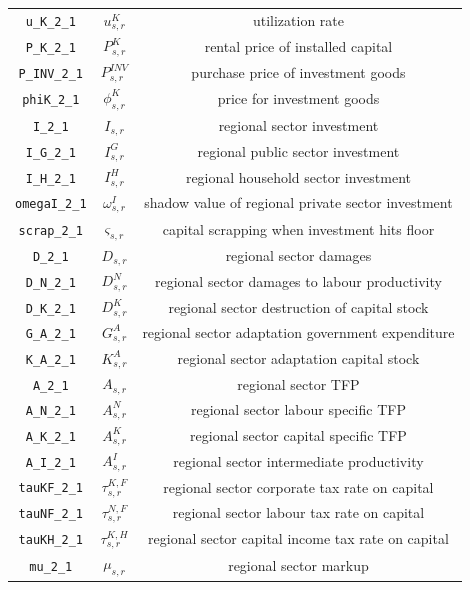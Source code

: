 \begin{center}
\begin{longtable}{ccc}
\texttt{u\_K\_2\_1} & ${u^K_{s,r}}$ & utilization rate\\
\texttt{P\_K\_2\_1} & ${P^K_{s,r}}$ & rental price of installed capital\\
\texttt{P\_INV\_2\_1} & ${P^{INV}_{s,r}}$ & purchase price of investment goods\\
\texttt{phiK\_2\_1} & ${\phi^K_{s,r}}$ & price for investment goods\\
\texttt{I\_2\_1} & ${I_{s,r}}$ & regional sector investment\\
\texttt{I\_G\_2\_1} & ${I^G_{s,r}}$ & regional public sector investment\\
\texttt{I\_H\_2\_1} & ${I^H_{s,r}}$ & regional household sector investment\\
\texttt{omegaI\_2\_1} & ${\omega^I_{s,r}}$ & shadow value of regional private sector investment\\
\texttt{scrap\_2\_1} & ${\varsigma_{s,r}}$ & capital scrapping when investment hits floor\\
\texttt{D\_2\_1} & ${D_{s,r}}$ & regional sector damages\\
\texttt{D\_N\_2\_1} & ${D^N_{s,r}}$ & regional sector damages to labour productivity\\
\texttt{D\_K\_2\_1} & ${D^K_{s,r}}$ & regional sector destruction of capital stock\\
\texttt{G\_A\_2\_1} & ${G^{A}_{s,r}}$ & regional sector adaptation government expenditure\\
\texttt{K\_A\_2\_1} & ${K^{A}_{s,r}}$ & regional sector adaptation capital stock\\
\texttt{A\_2\_1} & ${A_{s,r}}$ & regional sector TFP\\
\texttt{A\_N\_2\_1} & ${A^{N}_{s,r}}$ & regional sector labour specific TFP\\
\texttt{A\_K\_2\_1} & ${A^{K}_{s,r}}$ & regional sector capital specific TFP\\
\texttt{A\_I\_2\_1} & ${A^{I}_{s,r}}$ & regional sector intermediate productivity\\
\texttt{tauKF\_2\_1} & ${\tau^{K,F}_{s,r}}$ & regional sector corporate tax rate on capital\\
\texttt{tauNF\_2\_1} & ${\tau^{N,F}_{s,r}}$ & regional sector labour tax rate on capital\\
\texttt{tauKH\_2\_1} & ${\tau^{K,H}_{s,r}}$ & regional sector capital income tax rate on capital\\
\texttt{mu\_2\_1} & ${\mu_{s,r}}$ & regional sector markup\\

\end{longtable}
\end{center}
